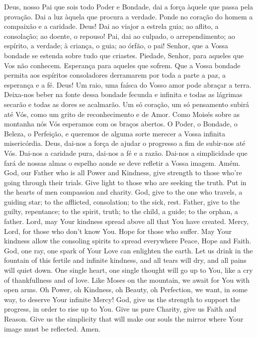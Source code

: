   \beginverse
    Deus, nosso Pai que sois todo Poder e Bondade, dai
    a força àquele que passa pela provação.
    \ind Dai a luz àquela que procura a verdade.
    \ind Ponde no coração do homem a compaixão e a caridade.
    \ind Deus! Dai ao viajor a estrela guia; ao aflito,
    a consolação; ao doente, o repouso!
    \ind Pai, dai ao culpado, o arrependimento; ao espírito,
    a verdade; à criança, o guia; ao órfão, o pai!
    \ind Senhor, que a Vossa bondade se estenda sobre tudo
    que criastes.
    \ind Piedade, Senhor, para aqueles que Vos não conhecem.
    \ind Esperança para aqueles que sofrem.
    \ind Que a Vossa bondade permita aos espíritos
    consoladores derramarem por toda a parte a paz, a
    esperança e a fé.
    \ind Deus! Um raio, uma faísca do Vosso amor pode abraçar
    a terra.
    \ind Deixa-nos beber na fonte dessa bondade fecunda
    e infinita e todas as lágrimas secarão e todas as
    dores se acalmarão.
    \ind Um só coração, um só pensamento subirá até Vós,
    como um grito de reconhecimento e de Amor.
    \ind Como Moisés sobre as montanha nós Vós esperamos
    com os braços abertos.
    \ind O Poder, o Bondade, o Beleza, o Perfeição, e
    queremos de alguma sorte merecer a Vossa infinita
    misericórdia.
    \ind Deus, dai-nos a força de ajudar o progresso a fim
    de subir-nos até Vós.
    \ind Dai-nos a caridade pura, dai-nos a fé e a razão.
    \ind Dai-nos a simplicidade que fará de nossas almas o
    espelho aonde se deve refletir a Vossa imagem.
    \parspace
    Amém.
  \endverse
  \brk
  \beginverse
    God, our Father who is all Power and Kindness,
    give strength to those who're going through
    their trials.
    \ind Give light to those who are seeking the truth.
    \ind Put in the hearts of men compassion and charity.
    \ind God, give to the one who travels, a guiding star;
    to the afflicted, consolation; to the sick, rest.
    \ind Father, give to the guilty, repentance; to the
    spirit, truth; to the child, a guide; to the orphan,
    a father.
    \ind Lord, may Your kindness spread above all that You
    have created.
    \ind Mercy, Lord, for those who don't know You.
    \ind Hope for those who suffer.
    \ind May Your kindness allow the consoling spirits to
    spread everywhere Peace, Hope and Faith.
    \ind God, one ray, one spark of Your Love can enlighten
    the earth.
    \ind Let us drink in the fountain of this fertile and
    infinite kindness, and all tears will dry, and all pains
    will quiet down.
    \ind One single heart, one single thought will go up to
    You, like a cry of thankfullness and of love.
    \ind Like Moses on the mountain, we await for You with
    open arms.
    \ind Oh Power, oh Kindness, oh Beauty, oh Perfection,
    we want, in some way, to deserve Your infinite Mercy!
    \ind God, give us the strength to support the progress,
    in order to rise up to You.
    \ind Give us pure Charity, give us Faith and Reason.
    \ind Give us the simplicity that will make our souls the
    mirror where Your image must be reflected.
    \parspace
    Amen.
  \endverse
\endsong


